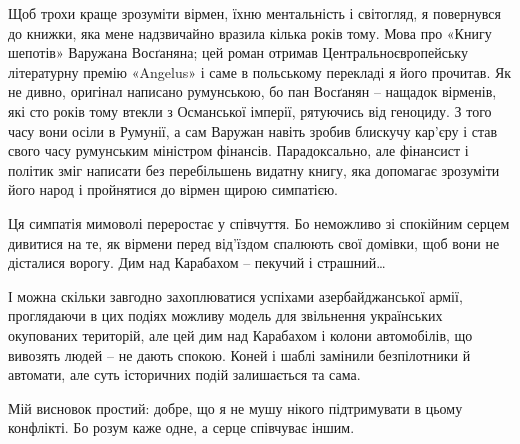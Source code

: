 Щоб трохи краще зрозуміти вірмен, їхню ментальність і світогляд, я повернувся
до книжки, яка мене надзвичайно вразила кілька років тому. Мова про «Книгу
шепотів» Варужана Восґаняна; цей роман отримав Центральноєвропейську
літературну премію «Angelus» і саме в польському перекладі я його прочитав. Як
не дивно, оригінал написано румунською, бо пан Восґанян – нащадок вірменів, які
сто років тому втекли з Османської імперії, рятуючись від геноциду. З того часу
вони осіли в Румунії, а сам Варужан навіть зробив блискучу кар’єру і став свого
часу румунським міністром фінансів. Парадоксально, але фінансист і політик зміг
написати без перебільшень видатну книгу, яка допомагає зрозуміти його народ і
пройнятися до вірмен щирою симпатією.

Ця симпатія мимоволі переростає у співчуття. Бо неможливо зі спокійним серцем
дивитися на те, як вірмени перед від’їздом спалюють свої домівки, щоб вони не
дісталися ворогу. Дим над Карабахом – пекучий і страшний…

І можна скільки завгодно захоплюватися успіхами азербайджанської армії,
проглядаючи в цих подіях можливу модель для звільнення українських окупованих
територій, але цей дим над Карабахом і колони автомобілів, що вивозять людей –
не дають спокою. Коней і шаблі замінили безпілотники й автомати, але суть
історичних подій залишається та сама.

Мій висновок простий: добре, що я не мушу нікого підтримувати в цьому
конфлікті. Бо розум каже одне, а серце співчуває іншим.

